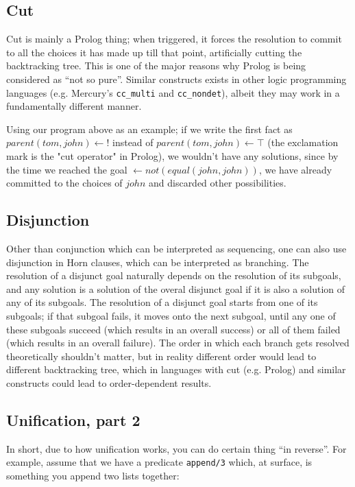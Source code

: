 \subsection{Cut}
\label{sec:org37d6662}

Cut is mainly a Prolog thing; when triggered, it forces the resolution to commit to all the choices it has made up till that point, artificially cutting the backtracking tree. This is one of the major reasons why Prolog is being considered as ``not so pure''. Similar constructs exists in other logic programming languages (e.g. Mercury's \texttt{cc\_multi} and \texttt{cc\_nondet}), albeit they may work in a fundamentally different manner.

Using our program above as an example; if we write the first fact as \(parent(tom,john)\leftarrow !\) instead of \(parent(tom,john)\leftarrow \top\) (the exclamation mark is the "cut operator" in Prolog), we wouldn't have any solutions, since by the time we reached the goal \(\leftarrow not(equal(john,john))\), we have already committed to the choices of \(john\) and discarded other possibilities.
\subsection{Disjunction}
\label{sec:orgf477dd8}

Other than conjunction which can be interpreted as sequencing, one can also use disjunction in Horn clauses, which can be interpreted as branching. The resolution of a disjunct goal naturally depends on the resolution of its subgoals, and any solution is a solution of the overal disjunct goal if it is also a solution of any of its subgoals. The resolution of a disjunct goal starts from one of its subgoals; if that subgoal fails, it moves onto the next subgoal, until any one of these subgoals succeed (which results in an overall success) or all of them failed (which results in an overall failure). The order in which each branch gets resolved theoretically shouldn't matter, but in reality different order would lead to different backtracking tree, which in languages with cut (e.g. Prolog) and similar constructs could lead to order-dependent results. 

\subsection{Unification, part 2}
\label{sec:orgb0fc1fb}

In short, due to how unification works, you can do certain thing ``in reverse''. For example, assume that we have a predicate \texttt{append/3} which, at surface, is something you append two lists together:

